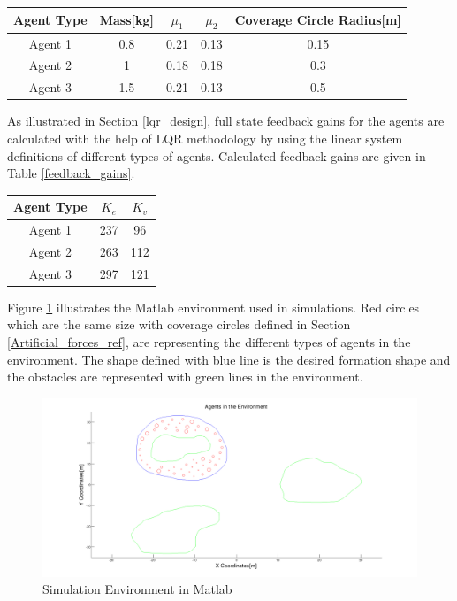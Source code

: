 \begin{center}
 \label{agent_props} 
\begin{tabular}{||c| c| c |c |c||}
				
\hline
\textbf{Agent Type} & \textbf{Mass[kg]}  & \textbf{$\mu_1$} & \textbf{$\mu_2$} & \textbf{Coverage Circle Radius[m]} \\ 
\hline
Agent 1& 0.8 & 0.21  & 0.13 & 0.15\\
Agent 2& 1   &  0.18 & 0.18 & 0.3\\	
Agent 3& 1.5 &  0.21 & 0.13 & 0.5\\	
\hline
\end{tabular}
\end{center}

As illustrated in Section \ref{lqr_design}, full state feedback gains for the agents are calculated with the help of LQR methodology by using the linear system definitions of different types of agents. Calculated feedback gains are given in Table \ref{feedback_gains}.

\begin{center}
 \label{feedback_gains} 
\begin{tabular}{||c| c |c||}
				
\hline
\textbf{Agent Type} & \textbf{$K_e$}  & \textbf{$K_v$} \\ 
\hline
Agent 1& 237 & 96\\
Agent 2& 263 & 112\\
Agent 3& 297 & 121\\
\hline
\end{tabular}
\end{center}

Figure \ref{Matlab_env} illustrates the Matlab environment used in simulations. Red circles which are the same size with coverage circles defined in Section \ref{Artificial_forces_ref}, are representing the different types of agents in the environment. The shape defined with blue line is the desired formation shape and the obstacles are represented with green lines in the environment. 

\begin{figure}[H]
\caption{Simulation Environment in Matlab} \label{Matlab_env}
\centerline{\includegraphics[scale = 0.30]{2}}
\end{figure} 
    
